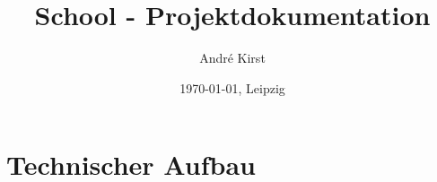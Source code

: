 \documentclass[12pt]{book}
\author{Andr\'{e} Kirst}
\date{\today{}, Leipzig}
\title{School - Projektdokumentation}
\begin{document}
\pagestyle{fancy} %
\fancyhf{} %
\fancyhead[C]{} %
\fancyhead[R]{} %
\renewcommand{\headrulewidth}{0.4pt} %
\fancyfoot[C]{\thepage} %
\renewcommand{\footrulewidth}{0.4pt} %

\fancyhead[OR]{} %
\fancyhead[ER]{} %


\maketitle



\newpage

\tableofcontents




\chapter{Technischer Aufbau}
\end{document}
